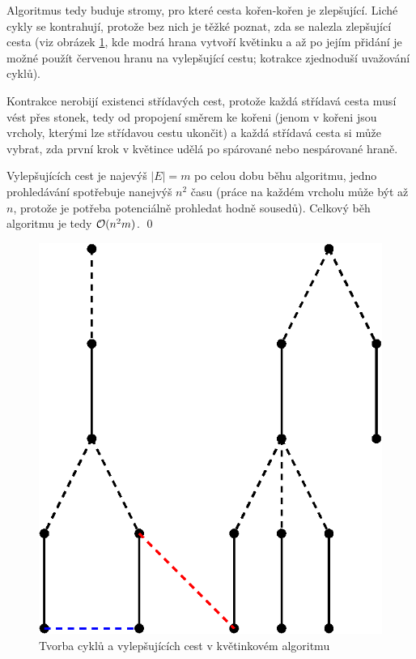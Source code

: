 Algoritmus tedy buduje stromy, pro které cesta kořen-kořen je zlepšující. Liché 
cykly se kontrahují, protože bez nich je těžké poznat, zda se nalezla zlepšující 
cesta (viz obrázek \ref{blossoms}, kde modrá hrana vytvoří květinku a až po 
jejím přidání je možné použít červenou hranu na vylepšující cestu; kotrakce 
zjednoduší uvažování cyklů).

Kontrakce nerobijí existenci střídavých cest, protože každá střídavá cesta musí 
vést přes stonek, tedy od propojení směrem ke kořeni (jenom v kořeni jsou 
vrcholy, kterými lze střídavou cestu ukončit) a každá střídavá cesta si může 
vybrat, zda první krok v květince udělá po spárované nebo nespárované hraně.

Vylepšujících cest je najevýš $|E| = m$ po celou dobu běhu algoritmu, jedno 
prohledávání spotřebuje nanejvýš $n^2$ času (práce na každém vrcholu může být až
$n$, protože je potřeba potenciálně prohledat hodně sousedů). Celkový běh 
algoritmu je tedy $\mathcal{O}(n^2m)$. \qed

\begin{figure}[h!]
	\centering
	\includegraphics{img/blossoms.eps}
	\caption{Tvorba cyklů a vylepšujících cest v květinkovém algoritmu}
	\label{blossoms}
\end{figure}

